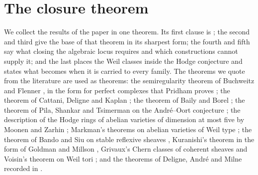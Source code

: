\documentclass[11pt,reqno]{amsart}
\theoremstyle{plain}
\theoremstyle{definition}
\theoremstyle{remark}
\begin{document}
\section{The closure theorem}\label{sec:final}

We collect the results of the paper in one theorem. Its first clause is
\cite[Theorem~1.1]{paperI}; the second and third give the base of that theorem in its
sharpest form; the fourth and fifth say what closing the algebraic locus
requires and which constructions cannot supply it; and the last places the
Weil classes inside the Hodge conjecture and states what \cite[Theorem~1.1]{paperI}
becomes when it is carried to every family. The theorems we quote from the
literature are used as theorems: the semiregularity theorem of Buchweitz and
Flenner \cite{BF03}, in the form for perfect complexes that Pridham proves
\cite{Pri24}; the theorem of Cattani, Deligne and Kaplan \cite{CDK95}; the
theorem of Baily and Borel \cite{BB66}; the theorem of Pila, Shankar and
Tsimerman on the Andr\'e--Oort conjecture \cite{PST}; the description of the
Hodge rings of abelian varieties of dimension at most five by Moonen and Zarhin
\cite{MZ99}; Markman's theorems on abelian varieties of Weil type
\cite{Mar25a,Mar25b}; the theorem of Bando and Siu on stable reflexive
sheaves \cite{BS94}, Kuranishi's theorem in the form of Goldman and Millson
\cite{Kur65,GM88}, Grivaux's Chern classes of coherent sheaves \cite{Gri10}
and Voisin's theorem on Weil tori \cite{Voi02b}; and the theorems of Deligne,
Andr\'e and Milne recorded in 
\cite{Del71,And96b,Mil20}.
\end{document}
